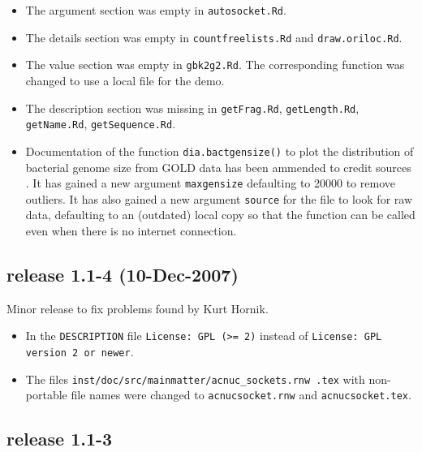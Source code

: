 \documentclass{article}
\begin{document}
\begin{itemize}

\item The argument section was empty in \texttt{autosocket.Rd}.

\item The details section was empty in \texttt{countfreelists.Rd} and
  \texttt{draw.oriloc.Rd}.

\item The value section was empty in \texttt{gbk2g2.Rd}. The corresponding
  function was changed to use a local file for the demo.

\item The description section was missing in \texttt{getFrag.Rd},
  \texttt{getLength.Rd}, \texttt{getName.Rd}, \texttt{getSequence.Rd}.

\item Documentation of the function \texttt{dia.bactgensize()} to plot 
  the distribution of bacterial genome size from GOLD data has been
  ammended to credit sources \cite{gold1, gold2, gold3, gold4}. It
  has gained a new argument \texttt{maxgensize} defaulting to 20000 
  to remove outliers. It has also gained a new argument \texttt{source}
  for the file to look for raw data, defaulting to an (outdated) local
  copy so that the function can be called even when there is no internet
  connection.

\end{itemize}

\subsection*{release 1.1-4 (10-Dec-2007)}

Minor release to fix problems found by Kurt Hornik.

\begin{itemize}

\item In the \texttt{DESCRIPTION} file \texttt{License: GPL (>= 2)} instead
  of \texttt{License: GPL version 2 or newer}.
 
\item The files \texttt{inst/doc/src/mainmatter/acnuc\_sockets.rnw .tex}
  with non-portable file names were changed to \texttt{acnucsocket.rnw}
  and \texttt{acnucsocket.tex}.

\end{itemize}

\subsection*{release 1.1-3}
\end{document}
